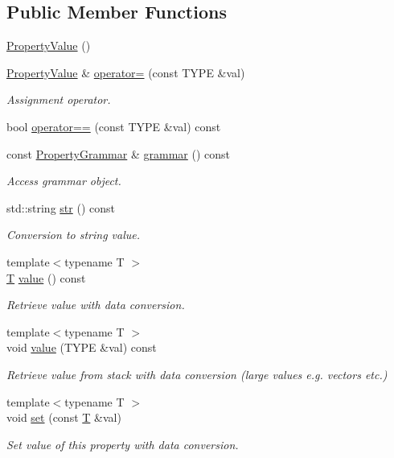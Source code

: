 \subsection*{Public Member Functions}
\begin{DoxyCompactItemize}
\item 
\hyperlink{class_d_d4hep_1_1_property_value_a6dcb85ebdb83313c9593c86431b3316e}{Property\+Value} ()
\item 
\hyperlink{class_d_d4hep_1_1_property_value}{Property\+Value} \& \hyperlink{class_d_d4hep_1_1_property_value_acb9f4997dbe446e56717ba1d58929303}{operator=} (const T\+Y\+PE \&val)
\begin{DoxyCompactList}\small\item\em Assignment operator. \end{DoxyCompactList}\item 
bool \hyperlink{class_d_d4hep_1_1_property_value_a63369b712ab6d115fae50dbd9c57fc88}{operator==} (const T\+Y\+PE \&val) const
\item 
const \hyperlink{class_d_d4hep_1_1_property_grammar}{Property\+Grammar} \& \hyperlink{class_d_d4hep_1_1_property_value_abf0f660431b35fceb1e74b3f122d18d4}{grammar} () const
\begin{DoxyCompactList}\small\item\em Access grammar object. \end{DoxyCompactList}\item 
std\+::string \hyperlink{class_d_d4hep_1_1_property_value_a956c6ca4ee9db4f237a109bac38e44d1}{str} () const
\begin{DoxyCompactList}\small\item\em Conversion to string value. \end{DoxyCompactList}\item 
{\footnotesize template$<$typename T $>$ }\\\hyperlink{class_t}{T} \hyperlink{class_d_d4hep_1_1_property_value_ab9c4701e14767a3a8e20658ddde2d8eb}{value} () const
\begin{DoxyCompactList}\small\item\em Retrieve value with data conversion. \end{DoxyCompactList}\item 
{\footnotesize template$<$typename T $>$ }\\void \hyperlink{class_d_d4hep_1_1_property_value_aa2525eeea938924a45de58e02d25c094}{value} (T\+Y\+PE \&val) const
\begin{DoxyCompactList}\small\item\em Retrieve value from stack with data conversion (large values e.\+g. vectors etc.) \end{DoxyCompactList}\item 
{\footnotesize template$<$typename T $>$ }\\void \hyperlink{class_d_d4hep_1_1_property_value_aa7c35e6fcfbff52b97c2ebbbae03dc2c}{set} (const \hyperlink{class_t}{T} \&val)
\begin{DoxyCompactList}\small\item\em Set value of this property with data conversion. \end{DoxyCompactList}\end{DoxyCompactItemize}
